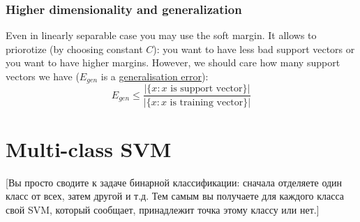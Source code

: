 \subsubsection*{Higher dimensionality and generalization}

Even in linearly separable case you may use the soft margin. It allows to priorotize (by choosing constant $C$): you want to have less bad support vectors or you want to have higher margins. However, we should care how many support vectors we have ($E_{gen}$ is a \hyperlink{gen_error}{generalisation error}):
$$E_{gen}\le\frac{|\{x\colon x \text{ is support vector}\}|}{|\{x\colon x \text{ is training vector}\}|}$$

\section{Multi-class SVM}

[Вы просто сводите к задаче бинарной классификации: сначала отделяете один класс от всех, затем другой и т.д. Тем самым вы получаете для каждого класса свой SVM, который сообщает, принадлежит точка этому классу или нет.]